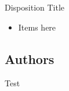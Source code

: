\begin{frame}{\secname}{Disposition}
	Title
	\begin{itemize}
		\item Items here
	\end{itemize}
\end{frame}

\subsection{Authors}
\begin{frame}{\secname}{\subsecname}
	Test
\end{frame}
